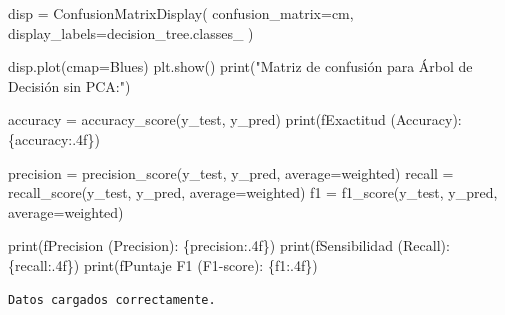 \documentclass[
  letterpaper,
  DIV=11,
  numbers=noendperiod]{scrartcl}
\newenvironment{Shaded}{\begin{snugshade}}{\end{snugshade}}
\newcommand{\BuiltInTok}[1]{\textcolor[rgb]{0.00,0.23,0.31}{#1}}
\newcommand{\NormalTok}[1]{\textcolor[rgb]{0.00,0.23,0.31}{#1}}
\newcommand{\OperatorTok}[1]{\textcolor[rgb]{0.37,0.37,0.37}{#1}}
\newcommand{\SpecialCharTok}[1]{\textcolor[rgb]{0.37,0.37,0.37}{#1}}
\newcommand{\SpecialStringTok}[1]{\textcolor[rgb]{0.13,0.47,0.30}{#1}}
\newcommand{\StringTok}[1]{\textcolor[rgb]{0.13,0.47,0.30}{#1}}
\begin{document}
\begin{Shaded}
\begin{Highlighting}[]
\NormalTok{disp }\OperatorTok{=}\NormalTok{ ConfusionMatrixDisplay(}
\NormalTok{  confusion\_matrix}\OperatorTok{=}\NormalTok{cm,}
\NormalTok{  display\_labels}\OperatorTok{=}\NormalTok{decision\_tree.classes\_}
\NormalTok{)}

\NormalTok{disp.plot(cmap}\OperatorTok{=}\StringTok{\textquotesingle{}Blues\textquotesingle{}}\NormalTok{)}
\NormalTok{plt.show()}
\BuiltInTok{print}\NormalTok{(}\StringTok{"Matriz de confusión para Árbol de Decisión sin PCA:"}\NormalTok{)}

\NormalTok{accuracy }\OperatorTok{=}\NormalTok{ accuracy\_score(y\_test, y\_pred)}
\BuiltInTok{print}\NormalTok{(}\SpecialStringTok{f\textquotesingle{}Exactitud (Accuracy): }\SpecialCharTok{\{}\NormalTok{accuracy}\SpecialCharTok{:.4f\}}\SpecialStringTok{\textquotesingle{}}\NormalTok{)}

\NormalTok{precision }\OperatorTok{=}\NormalTok{ precision\_score(y\_test, y\_pred, average}\OperatorTok{=}\StringTok{\textquotesingle{}weighted\textquotesingle{}}\NormalTok{)}
\NormalTok{recall }\OperatorTok{=}\NormalTok{ recall\_score(y\_test, y\_pred, average}\OperatorTok{=}\StringTok{\textquotesingle{}weighted\textquotesingle{}}\NormalTok{)}
\NormalTok{f1 }\OperatorTok{=}\NormalTok{ f1\_score(y\_test, y\_pred, average}\OperatorTok{=}\StringTok{\textquotesingle{}weighted\textquotesingle{}}\NormalTok{)}

\BuiltInTok{print}\NormalTok{(}\SpecialStringTok{f\textquotesingle{}Precision (Precision): }\SpecialCharTok{\{}\NormalTok{precision}\SpecialCharTok{:.4f\}}\SpecialStringTok{\textquotesingle{}}\NormalTok{)}
\BuiltInTok{print}\NormalTok{(}\SpecialStringTok{f\textquotesingle{}Sensibilidad (Recall): }\SpecialCharTok{\{}\NormalTok{recall}\SpecialCharTok{:.4f\}}\SpecialStringTok{\textquotesingle{}}\NormalTok{)}
\BuiltInTok{print}\NormalTok{(}\SpecialStringTok{f\textquotesingle{}Puntaje F1 (F1{-}score): }\SpecialCharTok{\{}\NormalTok{f1}\SpecialCharTok{:.4f\}}\SpecialStringTok{\textquotesingle{}}\NormalTok{)}
\end{Highlighting}
\end{Shaded}

\begin{verbatim}
Datos cargados correctamente.
\end{verbatim}
\end{document}
